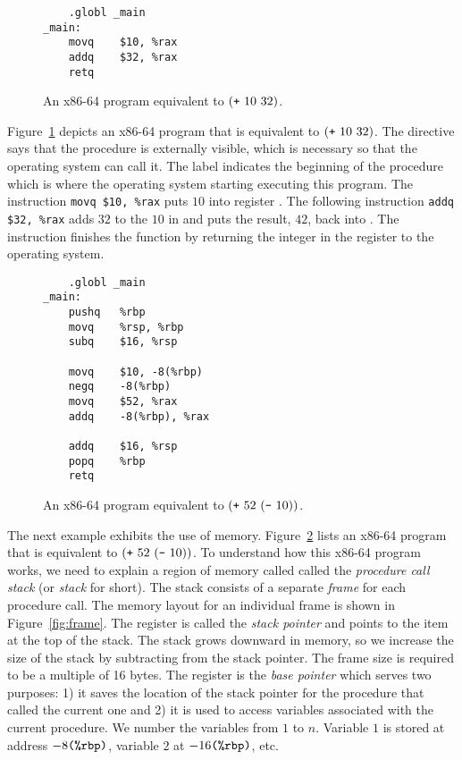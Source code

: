 \documentclass[12pt]{book}
\begin{document}
\begin{wrapfigure}{r}{2.25in}
\begin{lstlisting}
	.globl _main
_main:
	movq	$10, %rax
	addq	$32, %rax
	retq
\end{lstlisting}
\caption{An x86-64 program equivalent to $(\texttt{+}~10~32)$.}
\label{fig:p0-x86}
\end{wrapfigure}

Figure~\ref{fig:p0-x86} depicts an x86-64 program that is equivalent to
$(\texttt{+}~10~32)$. The  directive says that the
 procedure is externally visible, which is necessary so
that the operating system can call it. The label 
indicates the beginning of the  procedure which is where
the operating system starting executing this program.  The instruction
\lstinline{movq $10, %rax} puts $10$ into register . The
  following instruction \lstinline{addq $32, %rax} adds $32$ to the
    $10$ in  and puts the result, $42$, back into
    . The instruction  finishes the 
    function by returning the integer in the  register to the
    operating system.


\begin{wrapfigure}{r}{2.25in}
\begin{lstlisting}
	.globl _main
_main:
	pushq	%rbp
	movq	%rsp, %rbp
	subq	$16, %rsp

	movq	$10, -8(%rbp)
	negq	-8(%rbp)
	movq	$52, %rax
	addq	-8(%rbp), %rax

	addq	$16, %rsp
	popq	%rbp
	retq
\end{lstlisting}
\caption{An x86-64 program equivalent to $(\texttt{+}~52~(\texttt{-}~10) )$.}
\label{fig:p1-x86}
\end{wrapfigure}

The next example exhibits the use of memory.  Figure~\ref{fig:p1-x86}
lists an x86-64 program that is equivalent to $(\texttt{+}~52~
  (\texttt{-}~10) )$. To understand how this x86-64 program works, we
need to explain a region of memory called called the \emph{procedure
  call stack} (or \emph{stack} for short). The stack consists of a
separate \emph{frame} for each procedure call. The memory layout for
an individual frame is shown in Figure~\ref{fig:frame}.  The register
 is called the \emph{stack pointer} and points to the item at
the top of the stack. The stack grows downward in memory, so we
increase the size of the stack by subtracting from the stack
pointer. The frame size is required to be a multiple of 16 bytes. The
register  is the \emph{base pointer} which serves two
purposes: 1) it saves the location of the stack pointer for the
procedure that called the current one and 2) it is used to access
variables associated with the current procedure. We number the
variables from $1$ to $n$. Variable $1$ is stored at address
$-8\texttt{(\%rbp)}$, variable $2$ at $-16\texttt{(\%rbp)}$, etc.
\end{document}
